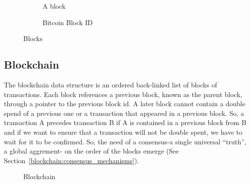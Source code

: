 \begin{figure}[ht!]
  \begin{subfigure}[t]{0.50\textwidth}
    \centering
    \caption{A block}
    \label{fig:block:a}
  \end{subfigure}
  \begin{subfigure}[t]{0.50\textwidth}
    \centering
    \caption{Bitcoin Block ID}
    \label{fig:block:b}
  \end{subfigure}
  \caption{Blocks}
  \label{fig:blocks}
\end{figure}

\subsection{Blockchain}\label{blockchain:structure:blockchain}

The blockchain data structure is an ordered back-linked list of blocks of transactions. Each block references a
previous block, known as the parent block, through a pointer to the previous block id. A later block cannot contain a double spend of a previous one or a transaction that appeared in a previous block.
So, a transaction A precedes transaction B if A is contained in a previous block from B and if we want to ensure that a transaction will not be double spent, we have to
wait for it to be confirmed. So, the need of a consensus-a single universal “truth”, a global aggrement- on the order of the blocks emerge (See Section~\ref{blockchain:consensus_mechanisms}).

\begin{figure}[ht!]
  \centering
  \caption{Blockchain}
  \label{fig:blockchain}
\end{figure}


